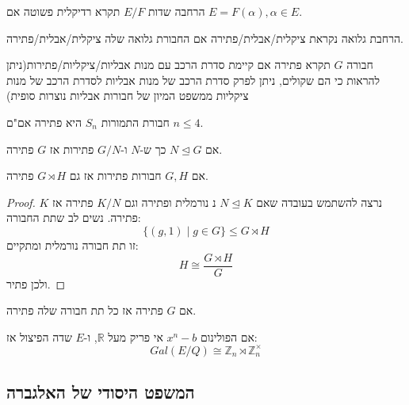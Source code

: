 \documentclass{tstextbook}
\begin{document}
\begin{definition}
הרחבה שדות \(E / F\) תקרא רדיקלית פשוטה אם \(E=F\left( \alpha \right),\alpha \in E\).

\end{definition}
\begin{definition}
הרחבת גלואה נקראת ציקלית/אבלית/פתירה אם החבורת גלואה שלה ציקלית/אבלית/פתירה.

\end{definition}
\begin{reminder}
חבורה \(G\) תקרא פתירה אם קיימת סדרת הרכב עם מנות אבליות/ציקליות/פתירות(ניתן להראות כי הם שקולים, ניתן לפרק סדרת הרכב של מנות אבליות לסדרת הרכב של מנות ציקליות ממשפט המיון של חבורות אבליות נוצרות סופית)

\end{reminder}
\begin{reminder}
חבורת התמורות \(S_{n}\) היא פתירה אם"ם \(n\leq 4\).

\end{reminder}
\begin{reminder}
אם \(N\trianglelefteq G\) כך ש-\(N\) ו-\(G / N\) פתירות אז \(G\) פתירה.

\end{reminder}
\begin{proposition}
אם \(G,H\) חבורות פתירות אז גם \(G\rtimes H\) פתירה.

\end{proposition}
\begin{proof}
נרצה להשתמש בעובדה שאם \(N \trianglelefteq K\) נ נורמלית ופתירה וגם \(K / N\) פתירה אז \(K\) פתירה.
נשים לב שתת החבורה:
$$\{(g,1)\mid g\in G\}\leq G\rtimes H$$
זו תת חבורה נורמלית ומתקיים:
$$H\cong{\frac{G\rtimes H}{G}}$$
ולכן פתיר.

\end{proof}
\begin{remark}
אם \(G\) פתירה אז כל תת חבורה שלה פתירה.

\end{remark}
\begin{theorem}
אם הפולינום \(x^{n}-b\) אי פריק מעל \(\mathbb{R}\), ו-\(E\) שדה הפיצול אז:
$$Gal(E / Q)\cong \mathbb{Z}_{n}\rtimes\mathbb{Z}_{n}^{\times}$$

\end{theorem}
\subsection{המשפט היסודי של האלגברה}
\end{document}
